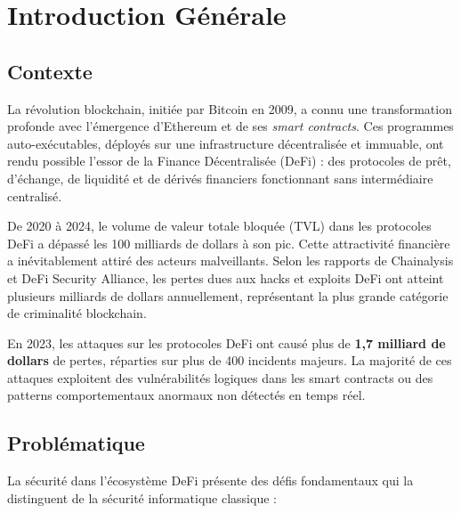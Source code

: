 \documentclass[12pt,a4paper]{report}
\begin{document}
\chapter{Introduction Générale}
\vspace{0pt}
\vspace{1cm}

\section{Contexte}

La révolution blockchain, initiée par Bitcoin en 2009, a connu une transformation profonde avec l'émergence d'Ethereum et de ses \textit{smart contracts}. Ces programmes auto-exécutables, déployés sur une infrastructure décentralisée et immuable, ont rendu possible l'essor de la Finance Décentralisée (DeFi) : des protocoles de prêt, d'échange, de liquidité et de dérivés financiers fonctionnant sans intermédiaire centralisé.

De 2020 à 2024, le volume de valeur totale bloquée (TVL) dans les protocoles DeFi a dépassé les 100 milliards de dollars à son pic. Cette attractivité financière a inévitablement attiré des acteurs malveillants. Selon les rapports de Chainalysis et DeFi Security Alliance, les pertes dues aux hacks et exploits DeFi ont atteint plusieurs milliards de dollars annuellement, représentant la plus grande catégorie de criminalité blockchain.

\begin{infobox}
En 2023, les attaques sur les protocoles DeFi ont causé plus de \textbf{1,7 milliard de dollars} de pertes, réparties sur plus de 400 incidents majeurs. La majorité de ces attaques exploitent des vulnérabilités logiques dans les smart contracts ou des patterns comportementaux anormaux non détectés en temps réel.
\end{infobox}

\section{Problématique}

La sécurité dans l'écosystème DeFi présente des défis fondamentaux qui la distinguent de la sécurité informatique classique :
\end{document}
